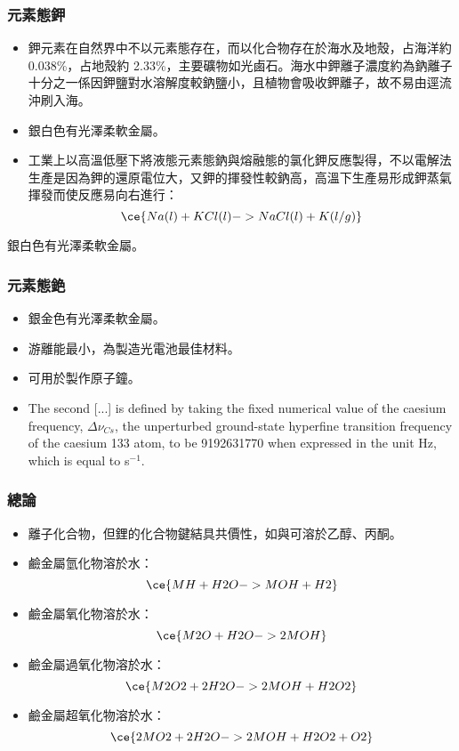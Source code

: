 \documentclass[a4paper,12pt]{report}
\begin{document}
\begin{itemize}
\begin{itemize}
\subsubsection{元素態鉀}
\begin{itemize}
\item 鉀元素在自然界中不以元素態存在，而以化合物存在於海水及地殼，占海洋約 0.038\%，占地殼約 2.33\%，主要礦物如光鹵石。海水中鉀離子濃度約為鈉離子十分之一係因鉀鹽對水溶解度較鈉鹽小，且植物會吸收鉀離子，故不易由逕流沖刷入海。
\item 銀白色有光澤柔軟金屬。
\item 工業上以高溫低壓下將液態元素態鈉與熔融態的氯化鉀反應製得，不以電解法生產是因為鉀的還原電位大，又鉀的揮發性較鈉高，高溫下生產易形成鉀蒸氣揮發而使反應易向右進行：
\[\ce{Na(l) + KCl(l) -> NaCl(l) + K(l/g)}\]
\end{itemize}
銀白色有光澤柔軟金屬。
\subsubsection{元素態銫}
\begin{itemize}
\item 銀金色有光澤柔軟金屬。
\item 游離能最小，為製造光電池最佳材料。
\item 可用於製作原子鐘。
\item The second [...] is defined by taking the fixed numerical value of the caesium frequency, $\Delta\nu_{Cs}$, the unperturbed ground-state hyperfine transition frequency of the caesium 133 atom, to be 9192631770 when expressed in the unit Hz, which is equal to s$^{-1}$.
\end{itemize}
\subsubsection{總論}
\begin{itemize}
\item 離子化合物，但鋰的化合物鍵結具共價性，如與可溶於乙醇、丙酮。
\item 鹼金屬氫化物溶於水：
\[\ce{MH + H2O -> MOH + H2}\]
\item 鹼金屬氧化物溶於水：
\[\ce{M2O + H2O -> 2MOH}\]
\item 鹼金屬過氧化物溶於水：
\[\ce{M2O2 + 2H2O -> 2MOH + H2O2}\]
\item 鹼金屬超氧化物溶於水：
\[\ce{2MO2 + 2H2O -> 2MOH + H2O2 + O2}\]
\end{itemize}

\end{itemize}
\end{itemize}
\end{document}
